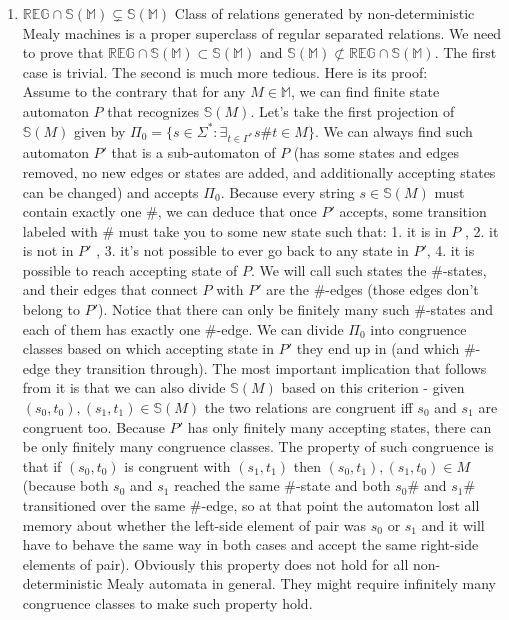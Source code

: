 \documentclass[12pt]{article}
\begin{document}
\begin{enumerate}
\item $\mathbb{REG} \cap \mathbb{S}(\mathbb{M}) \subsetneq \mathbb{S}(\mathbb{M})$ Class of relations generated by non-deterministic Mealy machines is a proper superclass of regular separated relations. We need to prove that $\mathbb{REG} \cap \mathbb{S}(\mathbb{M}) \subset \mathbb{S}(\mathbb{M})$ and $\mathbb{S}(\mathbb{M}) \not\subset \mathbb{REG} \cap \mathbb{S}(\mathbb{M})$. The first case is trivial. The second is much more tedious. Here is its proof: \\
Assume to the contrary that for any $M \in \mathbb{M}$, we can find finite state automaton $P$ that recognizes  $\mathbb{S}(M)$. Let's take the first projection of $\mathbb{S}(M)$ given by 
$\Pi_0 = \{s \in \Sigma^* : \exists_{t\in\Gamma^*} s\#t \in M\}$. We can always find such automaton $P'$ that is a sub-automaton of $P$ (has some states and edges removed, no new edges or states are added, and additionally accepting states can be changed) and accepts $\Pi_0$. Because every string $s \in  \mathbb{S}(M)$ must contain exactly one $\#$, we can deduce that once $P'$ accepts, some transition labeled with $\#$ must take you to some new state such that: 1. it is in $P$ , 2. it is not in $P'$ , 3. it's not possible to ever go back to any state in $P'$, 4. it is possible to  reach accepting state of $P$. We will call such states the $\#$-states, and their edges that connect $P$ with $P'$ are the $\#$-edges (those edges don't belong to $P'$). Notice that there can only be finitely many such $\#$-states and each of them has exactly one $\#$-edge. We can divide $\Pi_0$ into congruence classes based on which accepting state in $P'$ they end up in (and which $\#$-edge they transition through). The most important implication that follows from it is that we can also divide $ \mathbb{S}(M)$ based on this criterion - given $(s_0,t_0),(s_1,t_1) \in \mathbb{S}(M)$ the two relations are congruent iff $s_0$ and $s_1$ are congruent too. Because $P'$ has only finitely many accepting states, there can be only finitely many congruence classes. The property of such congruence is that if $(s_0,t_0)$ is congruent with $(s_1,t_1)$ then $(s_0,t_1),(s_1,t_0)\in M$ (because both $s_0$ and $s_1$ reached the same $\#$-state and both $s_0\#$ and $s_1\#$ transitioned over the same $\#$-edge, so at that point the automaton lost all memory about whether the left-side element of pair was $s_0$ or $s_1$ and it will have to behave the same way in both cases and accept the same right-side elements of pair). Obviously this property does not hold for all non-deterministic Mealy automata in general. They might require infinitely many congruence classes to make such property hold.


\end{enumerate}
\end{document}
